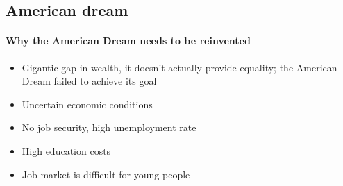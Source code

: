 \documentclass[10pt]{article}
\begin{document}
\subsection{American dream}
	\label{ssec:usa@dream}
\paragraph{Why the American Dream needs to be reinvented}
\begin{itemize}
\item Gigantic gap in wealth, it doesn’t actually provide equality; the American Dream failed to achieve its goal
\item Uncertain economic conditions
\item No job security, high unemployment rate
\item High education costs
\item Job market is difficult for young people
\end{itemize}
\end{document}
